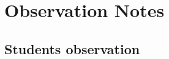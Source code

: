 \section{Observation Notes}
\label{sec:appendix_observation_notes}

\subsection{Students observation}
\label{subsec:appendix_students_observation}



